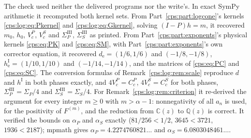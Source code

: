 \documentclass[11pt,letterpaper]{article}
\numberwithin{equation}{section}
\theoremstyle{remark}\newtheorem{remark}[theorem]{Remark}
\newcommand{\e}{\mathrm e}
\newcommand{\ap}{\alpha_P}\newcommand{\as}{\alpha_S}
\begin{document}
The check used neither the delivered programs nor the write's. In exact SymPy arithmetic it
recomputed both kernel sets. From Part~\ref{cps:part:logcone}'s kernels
\eqref{cps:log:eq:Pkernel} and \eqref{cps:log:eq:Gkernel}, solving $(I-P)h=m$, it recovered
$m_0$, $h_0$, $V^P_c$, $V^S_c$ and $\Sigma^{\mathrm{III}}_P$, $\Sigma^{\mathrm{III}}_S$ as
printed. From Part~\ref{cps:part:exponents}'s physical kernels \eqref{cps:eq:PK} and
\eqref{cps:eq:SM}, with Part~\ref{cps:part:exponents}'s own corrector equation, it recovered
$d_{\e}=(1/6,1/6)$ and $(-1/8,-1/8)$, $h^{\mathrm I}_{\e}=(1/10,1/10)$ and $(-1/14,-1/14)$, and
the matrices of \eqref{cps:eq:PC} and \eqref{cps:eq:SC}. The conversion formulas of
Remark~\ref{cps:log:rem:scale} reproduce $d$ and $h^{\mathrm I}$ in both phases exactly, and
$4V^P_c=C^P_c$, $4V^S_c=C^S_c$ for both phases, $\Sigma^{\mathrm{III}}_P=\Sigma_P/4$ and
$\Sigma^{\mathrm{III}}_S=\Sigma_S/4$. For Remark~\ref{cps:log:rem:criterion} it re-derived the
argument for every integer $m\ge0$ with $m>\alpha-1$: nonnegativity of all $a_n$ is used, for
the positivity of $F^{(m)}$, and the reduction from $\mathbb C(z)$ to $\mathbb Q(z)$ is correct.
It verified the bounds on $\ap$ and $\as$ exactly ($81/256<1/2$, $3645<3721$, $1936<2187$);
mpmath gives $\ap=4.2274760821\ldots$ and $\as=6.0803048461\ldots$.
\end{document}
